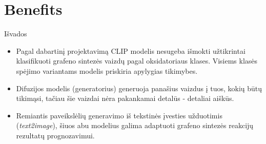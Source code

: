 \section{Benefits}

 \begin{frame}[c]{Išvados}
    \begin{itemize}
        \item Pagal dabartinį projektavimą CLIP modelis nesugeba išmokti užtikrintai klasifikuoti grafeno sintezės vaizdų pagal oksidatoriaus klases. Visiems klasės spėjimo variantams modelis priskiria apylygias tikimybes.
        \item Difuzijos modelis (generatorius) generuoja panašius vaizdus į tuos, kokių būtų tikimąsi, tačiau šie vaizdai nėra pakankamai detalūs - detaliai aiškūs.
        \item Remiantis paveikslėlių generavimo iš tekstinės įvesties užduotimis (\textit{text2image}), šiuos abu modelius galima adaptuoti grafeno sintezės reakcijų rezultatų prognozavimui.
    \end{itemize}
\end{frame}
